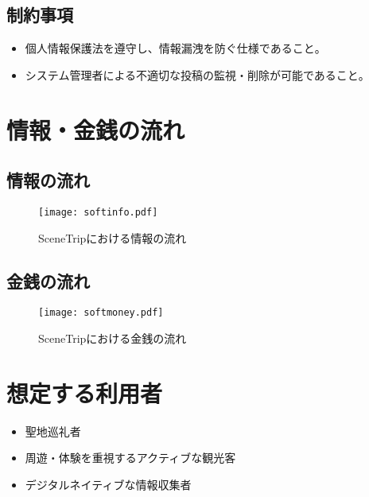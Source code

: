 \documentclass{docs}
\begin{document}
\subsection{制約事項}
\begin{itemize}
    \item 個人情報保護法を遵守し、情報漏洩を防ぐ仕様であること。
    \item システム管理者による不適切な投稿の監視・削除が可能であること。
\end{itemize}

\section{情報・金銭の流れ}
\subsection{情報の流れ}
\begin{figure}[H]
	\centering
	\texttt{[image: softinfo.pdf]}
	\caption{SceneTripにおける情報の流れ}\label{fig:info}
\end{figure}

\subsection{金銭の流れ}
\begin{figure}[H]
	\centering
	\texttt{[image: softmoney.pdf]}
	\caption{SceneTripにおける金銭の流れ}\label{fig:money}
\end{figure}


\section{想定する利用者}
\begin{itemize}
	\item 聖地巡礼者
	\item 周遊・体験を重視するアクティブな観光客
	\item デジタルネイティブな情報収集者
\end{itemize}
\end{document}
